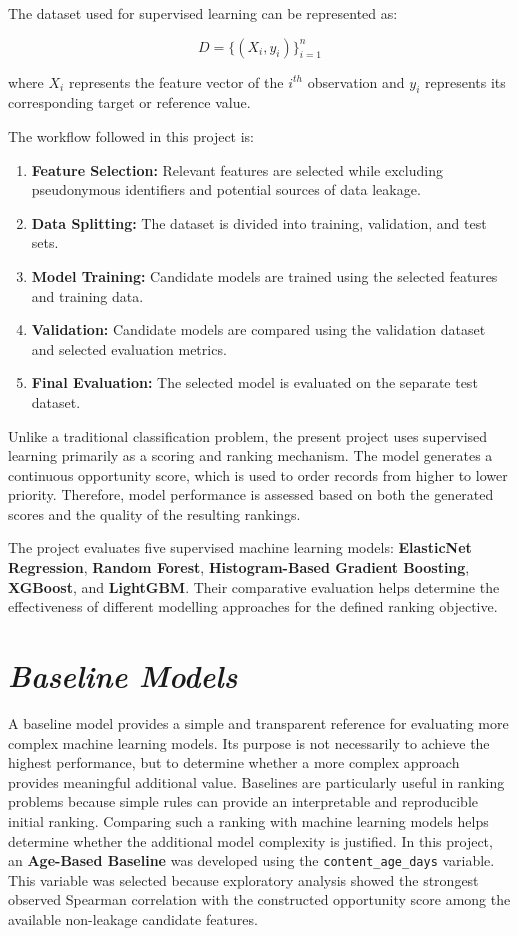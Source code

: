 \documentclass[12pt,a4paper]{report}
\begin{document}
The dataset used for supervised learning can be represented as:

\begin{equation}
D = \{(X_i, y_i)\}_{i=1}^{n}
\end{equation}

where $X_i$ represents the feature vector of the $i^{th}$ observation and $y_i$ represents its corresponding target or reference value.

The workflow followed in this project is:

\begin{enumerate}[leftmargin=*]
    \item \textbf{Feature Selection:} Relevant features are selected while excluding pseudonymous identifiers and potential sources of data leakage.
    \item \textbf{Data Splitting:} The dataset is divided into training, validation, and test sets.
    \item \textbf{Model Training:} Candidate models are trained using the selected features and training data.
    \item \textbf{Validation:} Candidate models are compared using the validation dataset and selected evaluation metrics.
    \item \textbf{Final Evaluation:} The selected model is evaluated on the separate test dataset.
\end{enumerate}

Unlike a traditional classification problem, the present project uses supervised learning primarily as a scoring and ranking mechanism. The model generates a continuous opportunity score, which is used to order records from higher to lower priority. Therefore, model performance is assessed based on both the generated scores and the quality of the resulting rankings.

The project evaluates five supervised machine learning models: \textbf{ElasticNet Regression}, \textbf{Random Forest}, \textbf{Histogram-Based Gradient Boosting}, \textbf{XGBoost}, and \textbf{LightGBM}. Their comparative evaluation helps determine the effectiveness of different modelling approaches for the defined ranking objective.

\section{\textit{Baseline Models}}
A baseline model provides a simple and transparent reference for evaluating more complex machine learning models. Its purpose is not necessarily to achieve the highest performance, but to determine whether a more complex approach provides meaningful additional value. Baselines are particularly useful in ranking problems because simple rules can provide an interpretable and reproducible initial ranking. Comparing such a ranking with machine learning models helps determine whether the additional model complexity is justified. In this project, an \textbf{Age-Based Baseline} was developed using the \texttt{content\_age\_days} variable. This variable was selected because exploratory analysis showed the strongest observed Spearman correlation with the constructed opportunity score among the available non-leakage candidate features.
\end{document}
